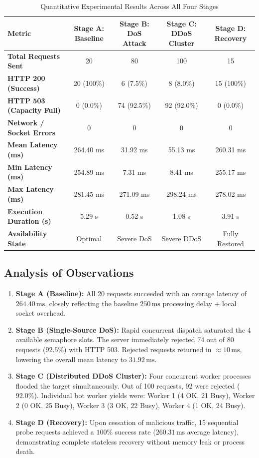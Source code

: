 \documentclass[11pt,a4paper]{article}
\begin{document}
\begin{table}[H]
\centering
\small
\caption{Quantitative Experimental Results Across All Four Stages}
\label{tab:results}
\begin{tabular}{lcccc}
\toprule
\textbf{Metric} & \textbf{Stage A: Baseline} & \textbf{Stage B: DoS Attack} & \textbf{Stage C: DDoS Cluster} & \textbf{Stage D: Recovery} \\
\midrule
\textbf{Total Requests Sent}     & 20          & 80          & 100         & 15          \\
\textbf{HTTP 200 (Success)}      & 20 (100\%)  & 6 (7.5\%)   & 8 (8.0\%)   & 15 (100\%)  \\
\textbf{HTTP 503 (Capacity Full)}& 0 (0.0\%)   & 74 (92.5\%) & 92 (92.0\%) & 0 (0.0\%)   \\
\textbf{Network / Socket Errors} & 0           & 0           & 0           & 0           \\
\textbf{Mean Latency (ms)}       & 264.40 ms   & 31.92 ms    & 55.13 ms    & 260.31 ms   \\
\textbf{Min Latency (ms)}        & 254.89 ms   & 7.31 ms     & 8.41 ms     & 255.17 ms   \\
\textbf{Max Latency (ms)}        & 281.45 ms   & 271.09 ms   & 298.24 ms   & 278.02 ms   \\
\textbf{Execution Duration (s)}  & 5.29 s      & 0.52 s      & 1.08 s      & 3.91 s      \\
\textbf{Availability State}      & Optimal     & Severe DoS  & Severe DDoS & Fully Restored \\
\bottomrule
\end{tabular}
\end{table}

\subsection{Analysis of Observations}
\begin{enumerate}[leftmargin=*]
    \item \textbf{Stage A (Baseline):} All 20 requests succeeded with an average latency of $264.40\,\text{ms}$, closely reflecting the baseline $250\,\text{ms}$ processing delay + local socket overhead.
    \item \textbf{Stage B (Single-Source DoS):} Rapid concurrent dispatch saturated the 4 available semaphore slots. The server immediately rejected 74 out of 80 requests ($92.5\%$) with HTTP 503. Rejected requests returned in $\approx 10\,\text{ms}$, lowering the overall mean latency to $31.92\,\text{ms}$.
    \item \textbf{Stage C (Distributed DDoS Cluster):} Four concurrent worker processes flooded the target simultaneously. Out of 100 requests, 92 were rejected ($92.0\%$). Individual bot worker yields were: Worker 1 (4 OK, 21 Busy), Worker 2 (0 OK, 25 Busy), Worker 3 (3 OK, 22 Busy), Worker 4 (1 OK, 24 Busy).
    \item \textbf{Stage D (Recovery):} Upon cessation of malicious traffic, 15 sequential probe requests achieved a $100\%$ success rate ($260.31\,\text{ms}$ average latency), demonstrating complete stateless recovery without memory leak or process death.
\end{enumerate}
\end{document}
